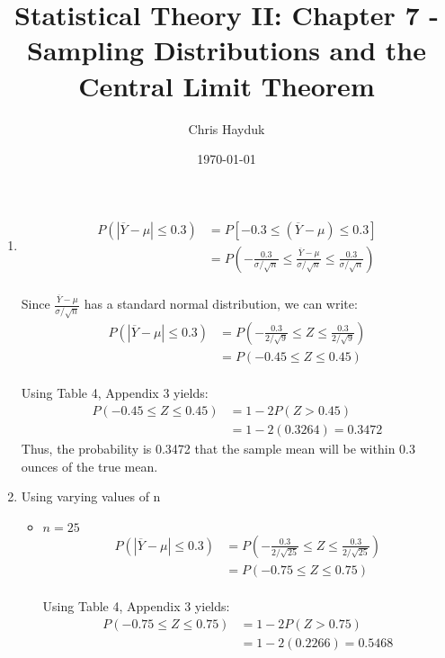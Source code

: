 \documentclass[12pt]{article}
\newenvironment{problem}[2][Problem]{\begin{trivlist}
\item[\hskip \labelsep {\bfseries #1}\hskip \labelsep {\bfseries #2.}]}{\end{trivlist}}
\begin{document}
\title{Statistical Theory II: Chapter 7 - Sampling Distributions and the Central Limit Theorem}

\author{Chris Hayduk}
\date{\today}

\maketitle

\begin{problem}{7.10}
\end{problem}

\begin{enumerate}[label=\alph*]
	\item\begin{align*}
		 P(|\overline{Y} - \mu| \leq 0.3)
		 &= P[-0.3 \leq (\overline{Y} - \mu) \leq 0.3]\\
		 &= P(-\frac{0.3}{\sigma/\sqrt{n}} \leq \frac{\overline{Y} - \mu}{\sigma/\sqrt{n}} \leq \frac{0.3}{\sigma/\sqrt{n}})
		 \end{align*}\\
		 Since $\frac{\overline{Y} - \mu}{\sigma/\sqrt{n}}$ has a standard normal distribution, we can write:
		 \begin{align*}
		 P(|\overline{Y} - \mu| \leq 0.3) &= P(-\frac{0.3}{2/\sqrt{9}} \leq Z \leq \frac{0.3}{2/\sqrt{9}})\\
		 &= P(-0.45 \leq Z \leq 0.45)
		 \end{align*}\\
		 Using Table 4, Appendix 3 yields:
		 \begin{align*}
		 P(-0.45 \leq Z \leq 0.45) &= 1 - 2P(Z > 0.45)\\&= 1 - 2(0.3264) = 0.3472
		 \end{align*}
		 Thus, the probability is 0.3472 that the sample mean will be within 0.3 ounces of the true mean.
	\item Using varying values of n
	\begin{itemize}
		\item $n = 25$\\
			  \begin{align*}
			  P(|\overline{Y} - \mu| \leq 0.3) &= P(-\frac{0.3}{2/\sqrt{25}} \leq Z \leq \frac{0.3}{2/\sqrt{25}})\\
			  &= P(-0.75 \leq Z \leq 0.75)
			  \end{align*}\\
			  Using Table 4, Appendix 3 yields:
			  \begin{align*}
			  P(-0.75 \leq Z \leq 0.75) &= 1 - 2P(Z > 0.75)\\&= 1 - 2(0.2266) = 0.5468

\end{align*}
\end{itemize}
\end{enumerate}
\end{document}
